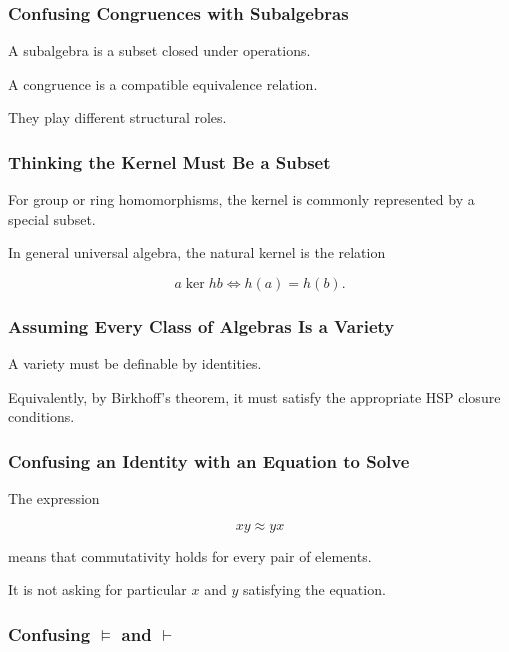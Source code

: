 \subsubsection{Confusing Congruences with Subalgebras}

A subalgebra is a subset closed under operations.

A congruence is a compatible equivalence relation.

They play different structural roles.

\subsubsection{Thinking the Kernel Must Be a Subset}

For group or ring homomorphisms, the kernel is commonly represented by a
special subset.

In general universal algebra, the natural kernel is the relation

\[ a\mathrel{\ker h}b\iff h(a)=h(b). \]

\subsubsection{Assuming Every Class of Algebras Is a Variety}

A variety must be definable by identities.

Equivalently, by Birkhoff's theorem, it must satisfy the appropriate HSP
closure conditions.

\subsubsection{Confusing an Identity with an Equation to Solve}

The expression

\[ xy\approx yx \]

means that commutativity holds for every pair of elements.

It is not asking for particular \(x\) and \(y\) satisfying the equation.

\subsubsection{Confusing \(\models\) and \(\vdash\)}

